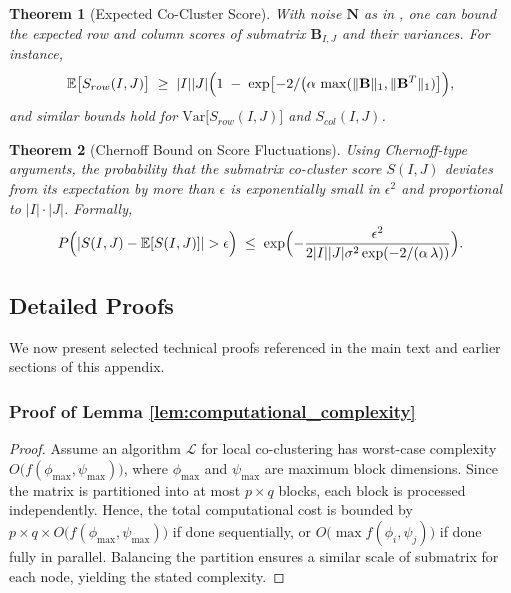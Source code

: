 \documentclass[journal]{IEEEtran}
\newtheorem{theorem}{Theorem}
\begin{document}
\begin{theorem}[Expected Co-Cluster Score]
    \label{thm:expected_cc_score}
    With noise \(\mathbf{N}\) as in , one can bound the expected row and column scores of submatrix \(\mathbf{B}_{I,J}\) and their variances. For instance,
    \begin{equation}
        \mathbb{E}\bigl\lbrack S_{row}(I,J)\bigr\rbrack \;\ge\; |I||J|\Bigl(1\;-\;\exp\bigl\lbrack -2/\bigl(\alpha\,\max(\|\mathbf{B}\|_1,\|\mathbf{B}^T\|_1)\bigr\rbrack \Bigr),
    \end{equation}
    and similar bounds hold for \(\text{Var}\lbrack S_{row}(I,J)\rbrack \) and \(S_{col}(I,J)\).
\end{theorem}

\begin{theorem}[Chernoff Bound on Score Fluctuations]
    \label{thm:chernoff_score}
    Using Chernoff-type arguments, the probability that the submatrix co-cluster score \(S(I,J)\) deviates from its expectation by more than \(\epsilon\) is exponentially small in \(\epsilon^2\) and proportional to \(|I|\cdot|J|\). Formally,
    \begin{equation}
        P\Bigl(|S(I,J)-\mathbb{E}\lbrack S(I,J)\rbrack | > \epsilon\Bigr) \;\le\; \exp\Bigl(-\frac{\epsilon^2}{2|I||J|\sigma^2 \exp(-2/(\alpha\,\lambda))}\Bigr).
    \end{equation}
\end{theorem}

\subsection{Detailed Proofs}
\label{subsec:detailed_proofs}

We now present selected technical proofs referenced in the main text and earlier sections of this appendix.

\subsubsection{Proof of Lemma \ref{lem:computational_complexity}}
\begin{proof}
    Assume an algorithm $\mathcal{L}$ for local co-clustering has worst-case complexity $O\bigl(f(\phi_{\max},\psi_{\max})\bigr)$, where $\phi_{\max}$ and $\psi_{\max}$ are maximum block dimensions. Since the matrix is partitioned into at most $p\times q$ blocks, each block is processed independently. Hence, the total computational cost is bounded by $p\times q \times O\bigl(f(\phi_{\max},\psi_{\max})\bigr)$ if done sequentially, or $O\bigl(\max f(\phi_i,\psi_j)\bigr)$ if done fully in parallel. Balancing the partition ensures a similar scale of submatrix for each node, yielding the stated complexity.
\end{proof}
\end{document}
